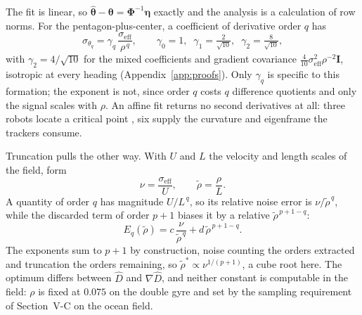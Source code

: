 \documentclass[lettersize,journal]{IEEEtran}
\begin{document}
The fit is linear, so $\hat{\boldsymbol{\theta}} -
\boldsymbol{\theta} = \boldsymbol{\Phi}^{-1}\boldsymbol{\eta}$ exactly
and the analysis is a calculation of row norms. For the
pentagon-plus-center, a coefficient of derivative order $q$ has
\begin{equation}
    \sigma_{\theta_q} = \gamma_q\,
    \frac{\sigma_{\mathrm{eff}}}{\rho^{\,q}},
    \qquad
    \gamma_0 = 1, \;\;
    \gamma_1 = \tfrac{2}{\sqrt{10}}, \;\;
    \gamma_2 = \tfrac{8}{\sqrt{10}},
    \label{eq:gain_ladder}
\end{equation}
with $\gamma_2 = 4/\sqrt{10}$ for the mixed coefficients and gradient
covariance $\tfrac{4}{10}\sigma_{\mathrm{eff}}^2\rho^{-2}\mathbf{I}$,
isotropic at every heading (Appendix~\ref{app:proofs}). Only $\gamma_q$ is specific to this
formation; the exponent is not, since order $q$ costs $q$ difference
quotients and only the signal scales with $\rho$. An affine fit returns
no second derivatives at all: three robots locate a critical point
\cite{14}, six supply the curvature and eigenframe the trackers
consume.

Truncation pulls the other way. With $U$ and $L$ the velocity and length
scales of the field, form
\begin{equation}
    \nu = \frac{\sigma_{\mathrm{eff}}}{U}, \qquad
    \tilde{\rho} = \frac{\rho}{L}.
    \label{eq:groups}
\end{equation}
A quantity of order $q$ has magnitude $U/L^{\,q}$, so its relative noise
error is $\nu/\tilde{\rho}^{\,q}$, while the discarded term of order
$p+1$ biases it by a relative $\tilde{\rho}^{\,p+1-q}$:
\begin{equation}
    E_q(\tilde{\rho}) = c\,\frac{\nu}{\tilde{\rho}^{\,q}}
        + d\,\tilde{\rho}^{\,p+1-q}.
    \label{eq:error_budget}
\end{equation}
The exponents sum to $p+1$ by construction, noise counting the orders
extracted and truncation the orders remaining, so $\tilde{\rho}^*
\propto \nu^{1/(p+1)}$, a cube root here. The optimum differs between
$\hat{D}$ and $\nabla\hat{D}$, and neither constant is computable in the
field: $\rho$ is fixed at $0.075$ on the double gyre and set by the sampling requirement of
Section~\mbox{V-C} on the ocean field.
\end{document}
